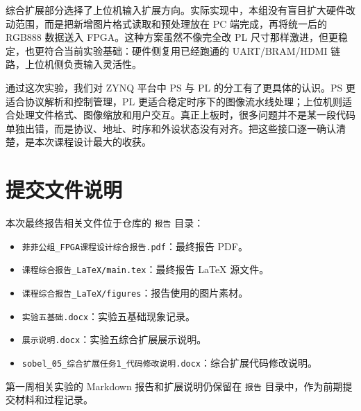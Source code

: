 \documentclass[12pt,a4paper]{ctexart}
\begin{document}
综合扩展部分选择了上位机输入扩展方向。实际实现中，本组没有盲目扩大硬件改动范围，而是把新增图片格式读取和预处理放在 PC 端完成，再将统一后的 RGB888 数据送入 FPGA。这种方案虽然不像完全改 PL 尺寸那样激进，但更稳定，也更符合当前实验基础：硬件侧复用已经跑通的 UART/BRAM/HDMI 链路，上位机侧负责输入灵活性。

通过这次实验，我们对 ZYNQ 平台中 PS 与 PL 的分工有了更具体的认识。PS 更适合协议解析和控制管理，PL 更适合稳定时序下的图像流水线处理；上位机则适合处理文件格式、图像缩放和用户交互。真正上板时，很多问题并不是某一段代码单独出错，而是协议、地址、时序和外设状态没有对齐。把这些接口逐一确认清楚，是本次课程设计最大的收获。

\appendix
\section{提交文件说明}

本次最终报告相关文件位于仓库的 \verb|报告| 目录：

\begin{itemize}
    \item \verb|菲菲公组_FPGA课程设计综合报告.pdf|：最终报告 PDF。
    \item \verb|课程综合报告_LaTeX/main.tex|：最终报告 LaTeX 源文件。
    \item \verb|课程综合报告_LaTeX/figures|：报告使用的图片素材。
    \item \verb|实验五基础.docx|：实验五基础现象记录。
    \item \verb|展示说明.docx|：实验五综合扩展展示说明。
    \item \verb|sobel_05_综合扩展任务1_代码修改说明.docx|：综合扩展代码修改说明。
\end{itemize}

第一周相关实验的 Markdown 报告和扩展说明仍保留在 \verb|报告| 目录中，作为前期提交材料和过程记录。
\end{document}
